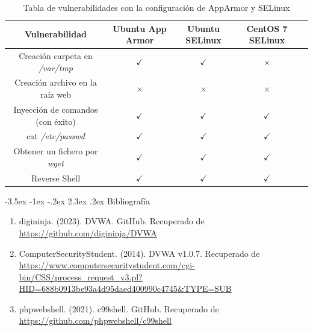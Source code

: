 \documentclass[11pt]{report}
\makeatletter
\renewcommand\chapter{\@startsection{chapter}{0}{\z@}%
    {-3.5ex \@plus -1ex \@minus -.2ex}%
    {2.3ex \@plus.2ex}%
    {\normalfont\Large\bfseries}}
\makeatother
\begin{document}
\begin{table}[H]
  \centering
  \begin{tabular}{|c|c|c|c|c|}
    \hline
    \textbf{Vulnerabilidad}             & \textbf{Ubuntu App Armor} & \textbf{Ubuntu SELinux} & \textbf{CentOS 7 SELinux} \\ \hline
    Creación carpeta en \emph{/var/tmp} & $\checkmark$              & $\checkmark$            & $\times$                  \\ \hline
    Creación archivo en la raíz web     & $\times$                  & $\times$                & $\times$                  \\ \hline
    Inyección de comandos (con éxito)   & $\checkmark$              & $\checkmark$            & $\checkmark$              \\ \hline
    cat \emph{/etc/passwd}              & $\checkmark$              & $\checkmark$            & $\checkmark$              \\ \hline
    Obtener un fichero por \emph{wget}  & $\checkmark$              & $\checkmark$            & $\checkmark$              \\ \hline
    Reverse Shell                       & $\checkmark$              & $\checkmark$            & $\checkmark$              \\ \hline
  \end{tabular}
  \caption{Tabla de vulnerabilidades con la configuración de AppArmor y SELinux}
\end{table}

\chapter{Bibliografía} %
\begin{enumerate}
  \item digininja. (2023). DVWA. GitHub. Recuperado de \url{https://github.com/digininja/DVWA}
  \item ComputerSecurityStudent. (2014). DVWA v1.0.7. Recuperado de \url{https://www.computersecuritystudent.com/cgi-bin/CSS/process_request_v3.pl?HID=688b0913be93a4d95daed400990c4745&TYPE=SUB}
  \item phpwebshell. (2021). c99shell. GitHub. Recuperado de \url{https://github.com/phpwebshell/c99shell}
\end{enumerate}
\end{document}
